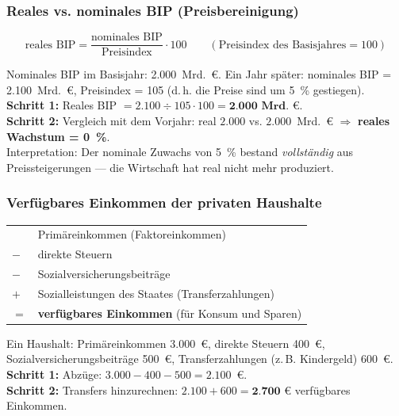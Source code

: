 \documentclass[11pt, a4paper]{article}
\begin{document}
\subsubsection{Reales vs. nominales BIP (Preisbereinigung)}

\begin{merksatz}[title={\bfseries Formel: reales BIP}]
\[
\text{reales BIP} = \frac{\text{nominales BIP}}{\text{Preisindex}} \cdot 100
\qquad (\text{Preisindex des Basisjahres} = 100)
\]
\end{merksatz}

\begin{beispiel}
Nominales BIP im Basisjahr: 2.000~Mrd.~€. Ein Jahr später: nominales BIP =
2.100~Mrd.~€, Preisindex = 105 (d.\,h. die Preise sind um 5~\% gestiegen).\\[0.3em]
\textbf{Schritt 1:} Reales BIP $= 2.100 \div 105 \cdot 100 = \textbf{2.000~Mrd.~€}$.\\
\textbf{Schritt 2:} Vergleich mit dem Vorjahr: real $2.000$ vs. $2.000$~Mrd.~€
$\Rightarrow$ \textbf{reales Wachstum = 0~\%}.\\[0.3em]
Interpretation: Der nominale Zuwachs von 5~\% bestand \emph{vollständig} aus
Preissteigerungen --- die Wirtschaft hat real nicht mehr produziert.
\end{beispiel}

\subsubsection{Verfügbares Einkommen der privaten Haushalte}

\begin{merksatz}[title={\bfseries Schema: verfügbares Einkommen}]
\begin{tabular}{ll}
  & Primäreinkommen (Faktoreinkommen)\\
$-$ & direkte Steuern\\
$-$ & Sozialversicherungsbeiträge\\
$+$ & Sozialleistungen des Staates (Transferzahlungen)\\
\midrule
$=$ & \textbf{verfügbares Einkommen} (für Konsum und Sparen)
\end{tabular}
\end{merksatz}

\begin{beispiel}
Ein Haushalt: Primäreinkommen 3.000~€, direkte Steuern 400~€,
Sozialversicherungsbeiträge 500~€, Transferzahlungen (z.\,B. Kindergeld) 600~€.\\[0.3em]
\textbf{Schritt 1:} Abzüge: $3.000 - 400 - 500 = 2.100$~€.\\
\textbf{Schritt 2:} Transfers hinzurechnen: $2.100 + 600 = \textbf{2.700~€}$
verfügbares Einkommen.
\end{beispiel}
\end{document}
